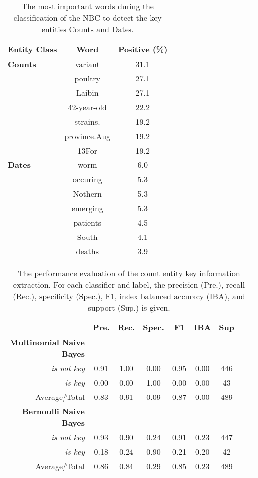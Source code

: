 \begin{table}
  \centering
  \caption{The most important words during the classification of the NBC to detect the key entities Counts and Dates.}
  \begin{tabular}{@{}lcc@{}}
    \toprule
    \textbf{Entity Class}& \textbf{Word} & \textbf{Positive (\%)}\\
    \midrule
    \textbf{Counts}& variant& 31.1\\
    & poultry& 27.1\\
    & Laibin& 27.1\\
    & 42-year-old& 22.2\\
    & strains.& 19.2\\
    & province.Aug& 19.2\\
    & 13For& 19.2\vspace{2mm}\\
    \textbf{Dates}
    & worm& 6.0\\
    & occuring& 5.3\\
    & Nothern& 5.3\\
    & emerging& 5.3\\
    & patients& 4.5\\
    & South& 4.1\\
    & deaths& 3.9\\
    \bottomrule
  \end{tabular}
\label{table:important_words}
\end{table}

\begin{table}
  \caption{The performance evaluation of the count entity key information extraction. For each classifier and label, the precision (Pre.), recall (Rec.), specificity (Spec.), F1, index balanced accuracy (IBA), and support (Sup.) is given.}
  \centering
  \begin{tabular}{@{}rcccccccc@{}}
    \toprule
     & \textbf{Pre.} & \textbf{Rec.} & \textbf{Spec.}
    & \textbf{F1} &  \textbf{IBA}& \textbf{Sup} \\
    \midrule
    \textbf{Multinomial Naive Bayes}\\
    \emph{is not key}& 0.91& 1.00&  0.00& 0.95& 0.00& 446 \\
    \emph{is key}& 0.00& 0.00&  1.00& 0.00& 0.00& 43 \\
    Average/Total& 0.83& 0.91& 0.09& 0.87& 0.00& 489 \vspace{2mm}\\
    \textbf{Bernoulli Naive Bayes}\\
    \emph{is not key}& 0.93& 0.90&  0.24& 0.91& 0.23& 447 \\
    \emph{is key}& 0.18& 0.24&  0.90& 0.21& 0.20& 42 \\
    Average/Total& 0.86& 0.84& 0.29& 0.85& 0.23& 489 \vspace{2mm}\\
    \bottomrule
  \end{tabular}
\label{table:keyword_performance_counts}
\end{table}


